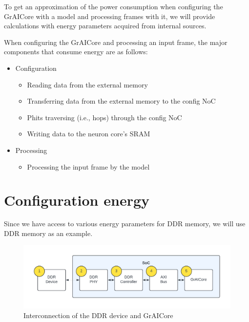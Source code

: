 To get an approximation of the power consumption when configuring the GrAICore with a model and processing frames with it, we will provide calculations with energy parameters acquired from internal sources.

When configuring the GrAICore and processing an input frame, the major components that consume energy are as follows:
\begin{itemize}
    \item Configuration
    \begin{itemize}
        \item Reading data from the external memory
        \item Transferring data from the external memory to the config NoC
        \item Phits traversing (i.e., hops) through the config NoC
        \item Writing data to the neuron core's SRAM
    \end{itemize}
    \item Processing
    \begin{itemize}
        \item Processing the input frame by the model
    \end{itemize}
\end{itemize}

\section{Configuration energy}
Since we have access to various energy parameters for DDR memory, we will use DDR memory as an example.

\begin{figure}[hbtp]
    \centering
    \includegraphics[width=0.8\linewidth]{assets/ddr_graicore_block_diagram.pdf}
    \caption{
        Interconnection of the DDR device and GrAICore
    }
    \label{fig:ddr_graicore_block_diagram}
\end{figure}

